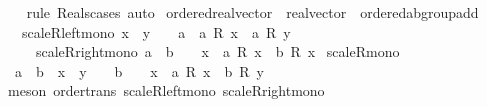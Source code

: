\begin{isabellebody}
%
\isadelimproof
\ \ %
\endisadelimproof
%
\isatagproof
{}\isamarkupfalse%
\ {\isacharparenleft}{\kern0pt}rule\ Reals{\isacharunderscore}{\kern0pt}cases{\isacharparenright}{\kern0pt}\ auto%
\endisatagproof
{\isafoldproof}%
%
\isadelimproof
%
\endisadelimproof
%
\isadelimdocument
%
\endisadelimdocument
%
\isatagdocument
%
\isamarkuptrue%
%
\endisatagdocument
{\isafolddocument}%
%
\isadelimdocument
%
\endisadelimdocument
{}\isamarkupfalse%
\ ordered{\isacharunderscore}{\kern0pt}real{\isacharunderscore}{\kern0pt}vector\ {\isacharequal}{\kern0pt}\ real{\isacharunderscore}{\kern0pt}vector\ {\isacharplus}{\kern0pt}\ ordered{\isacharunderscore}{\kern0pt}ab{\isacharunderscore}{\kern0pt}group{\isacharunderscore}{\kern0pt}add\ {\isacharplus}{\kern0pt}\isanewline
\ \ \ scaleR{\isacharunderscore}{\kern0pt}left{\isacharunderscore}{\kern0pt}mono{\isacharcolon}{\kern0pt}\ {\isachardoublequoteopen}x\ {\isasymle}\ y\ {\isasymLongrightarrow}\ {}\ {\isasymle}\ a\ {\isasymLongrightarrow}\ a\ {\isacharasterisk}{\kern0pt}\isactrlsub R\ x\ {\isasymle}\ a\ {\isacharasterisk}{\kern0pt}\isactrlsub R\ y{\isachardoublequoteclose}\isanewline
\ \ \ \ \ scaleR{\isacharunderscore}{\kern0pt}right{\isacharunderscore}{\kern0pt}mono{\isacharcolon}{\kern0pt}\ {\isachardoublequoteopen}a\ {\isasymle}\ b\ {\isasymLongrightarrow}\ {}\ {\isasymle}\ x\ {\isasymLongrightarrow}\ a\ {\isacharasterisk}{\kern0pt}\isactrlsub R\ x\ {\isasymle}\ b\ {\isacharasterisk}{\kern0pt}\isactrlsub R\ x{\isachardoublequoteclose}\isanewline
{}\isanewline
\isanewline
{}\isamarkupfalse%
\ scaleR{\isacharunderscore}{\kern0pt}mono{\isacharcolon}{\kern0pt}\isanewline
\ \ {\isachardoublequoteopen}a\ {\isasymle}\ b\ {\isasymLongrightarrow}\ x\ {\isasymle}\ y\ {\isasymLongrightarrow}\ {}\ {\isasymle}\ b\ {\isasymLongrightarrow}\ {}\ {\isasymle}\ x\ {\isasymLongrightarrow}\ a\ {\isacharasterisk}{\kern0pt}\isactrlsub R\ x\ {\isasymle}\ b\ {\isacharasterisk}{\kern0pt}\isactrlsub R\ y{\isachardoublequoteclose}\isanewline
%
\isadelimproof
\ \ %
\endisadelimproof
%
\isatagproof
{}\isamarkupfalse%
\ {\isacharparenleft}{\kern0pt}meson\ order{\isacharunderscore}{\kern0pt}trans\ scaleR{\isacharunderscore}{\kern0pt}left{\isacharunderscore}{\kern0pt}mono\ scaleR{\isacharunderscore}{\kern0pt}right{\isacharunderscore}{\kern0pt}mono{\isacharparenright}{\kern0pt}%
\endisatagproof
{\isafoldproof}%
%
\isadelimproof
\isanewline
%
\endisadelimproof

\end{isabellebody}
